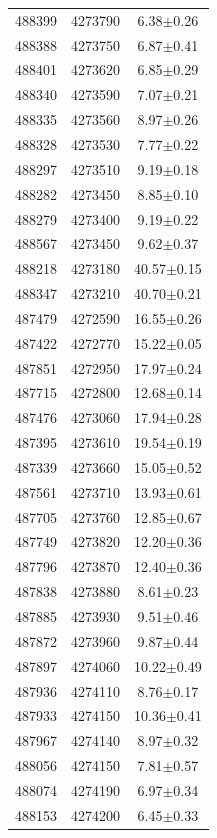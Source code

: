 \documentclass[12pt,letter]{article}
\begin{document}
\begin{center}
\begin{supertabular}{c c c}
488399	 & 	4273790	 & 	6.38$\pm$0.26\\ 
488388	 & 	4273750	 & 	6.87$\pm$0.41\\ 
488401	 & 	4273620	 & 	6.85$\pm$0.29\\ 
488340	 & 	4273590	 & 	7.07$\pm$0.21\\ 
488335	 & 	4273560	 & 	8.97$\pm$0.26\\ 
488328	 & 	4273530	 & 	7.77$\pm$0.22\\ 
488297	 & 	4273510	 & 	9.19$\pm$0.18\\ 
488282	 & 	4273450	 & 	8.85$\pm$0.10\\ 
488279	 & 	4273400	 & 	9.19$\pm$0.22\\ 
488567	 & 	4273450	 & 	9.62$\pm$0.37\\ 
488218	 & 	4273180	 & 	40.57$\pm$0.15\\ 
488347	 & 	4273210	 & 	40.70$\pm$0.21\\ 
487479	 & 	4272590	 & 	16.55$\pm$0.26\\ 
487422	 & 	4272770	 & 	15.22$\pm$0.05\\ 
487851	 & 	4272950	 & 	17.97$\pm$0.24\\ 
487715	 & 	4272800	 & 	12.68$\pm$0.14\\ 
487476	 & 	4273060	 & 	17.94$\pm$0.28\\ 
487395	 & 	4273610	 & 	19.54$\pm$0.19\\ 
487339	 & 	4273660	 & 	15.05$\pm$0.52\\ 
487561	 & 	4273710	 & 	13.93$\pm$0.61\\ 
487705	 & 	4273760	 & 	12.85$\pm$0.67\\ 
487749	 & 	4273820	 & 	12.20$\pm$0.36\\ 
487796	 & 	4273870	 & 	12.40$\pm$0.36\\ 
487838	 & 	4273880	 & 	8.61$\pm$0.23\\ 
487885	 & 	4273930	 & 	9.51$\pm$0.46\\ 
487872	 & 	4273960	 & 	9.87$\pm$0.44\\ 
487897	 & 	4274060	 & 	10.22$\pm$0.49\\ 
487936	 & 	4274110	 & 	8.76$\pm$0.17\\ 
487933	 & 	4274150	 & 	10.36$\pm$0.41\\ 
487967	 & 	4274140	 & 	8.97$\pm$0.32\\ 
488056	 & 	4274150	 & 	7.81$\pm$0.57\\ 
488074	 & 	4274190	 & 	6.97$\pm$0.34\\ 
488153	 & 	4274200	 & 	6.45$\pm$0.33\\ 

\end{supertabular}
\end{center}
\end{document}

